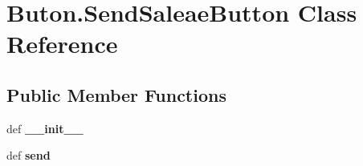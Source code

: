 \hypertarget{classButon_1_1SendSaleaeButton}{\section{Buton.\+Send\+Saleae\+Button Class Reference}
\label{classButon_1_1SendSaleaeButton}
}
\subsection*{Public Member Functions}
\begin{DoxyCompactItemize}
\item 
\hypertarget{classButon_1_1SendSaleaeButton_ad597987752f13271716e1b74c6f7fb74}{def {\bfseries \+\_\+\+\_\+init\+\_\+\+\_\+}}\label{classButon_1_1SendSaleaeButton_ad597987752f13271716e1b74c6f7fb74}

\item 
\hypertarget{classButon_1_1SendSaleaeButton_a3839533414ef3ca3a7e81395dd923c37}{def {\bfseries send}}\label{classButon_1_1SendSaleaeButton_a3839533414ef3ca3a7e81395dd923c37}

\end{DoxyCompactItemize}
